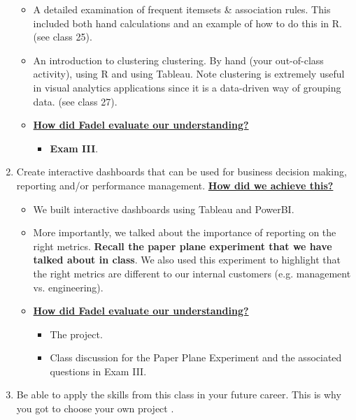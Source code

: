\documentclass[letterpaper,12pt]{article}
\begin{document}
\begin{enumerate}[label=(\Alph*)]
\begin{itemize}[nosep]
		\item A detailed examination of frequent itemsets \& association rules. This included both hand calculations and an example of how to do this in R. (see class 25).
		\item An introduction to clustering clustering. By hand (your out-of-class activity), using R and using Tableau. Note clustering is extremely useful in visual analytics applications since it is a data-driven way of grouping data. (see class 27).
		\item \textbf{\ul{How did Fadel evaluate our understanding?}}
		\begin{itemize}[nosep]
			\item \textbf{Exam III}.
		\end{itemize}
	\end{itemize}
	\item Create interactive dashboards that can be used for business decision making, reporting and/or performance management.  \textbf{\ul{How did we achieve this?}}
	\begin{itemize}[nosep]
		\item We built interactive dashboards using Tableau and PowerBI. 
		\item More importantly, we talked about the importance of reporting on the right metrics. \textbf{Recall the paper plane experiment that we have talked about in class}. We also used this experiment to highlight that the right metrics are different to our internal customers (e.g. management vs. engineering).
		\item \textbf{\ul{How did Fadel evaluate our understanding?}}
		\begin{itemize}[nosep]
			\item The project.
			\item Class discussion for the Paper Plane Experiment and the associated questions in Exam III.
		\end{itemize}
	\end{itemize}
	\item Be able to apply the skills from this class in your future career. This is why you got to choose your own project \smiley{}.
	
\end{enumerate}
\end{document}
